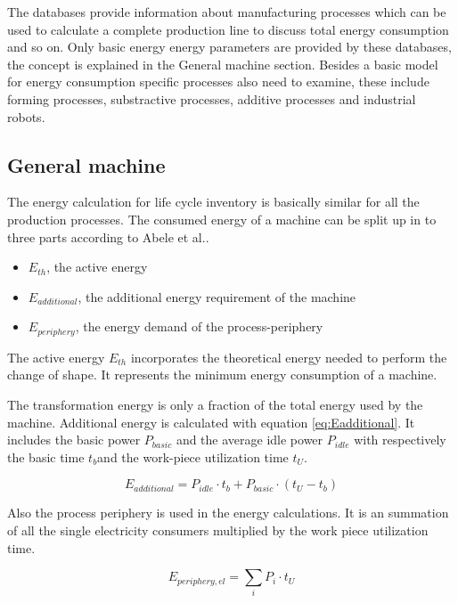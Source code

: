 The databases provide information about manufacturing processes which can be used to calculate a complete production line to discuss total energy consumption and so on. Only basic energy energy parameters are provided by these databases, the concept is explained in the General machine section. Besides a basic model for energy consumption specific processes  also need to examine, these include forming processes, substractive processes, additive processes and industrial robots.

\subsection{General machine}

The energy calculation for life cycle inventory is basically similar for all the production processes. The consumed energy of a machine can be split up in to three parts according to Abele et al.\cite{Abele2005}.
\begin{itemize}  
\item $E_{th}$, the active energy 
\item $E_{additional}$, the additional energy requirement of the machine 
\item $E_{periphery}$, the energy demand of the process-periphery 
\end{itemize}

The active energy $E_{th}$ incorporates the theoretical energy needed to perform the change of shape. It represents the minimum energy consumption of a machine. 

The transformation energy is only a fraction of the total energy used by the machine. Additional energy is calculated with equation \ref{eq:Eadditional}. It includes the basic power $P_{basic}$ and the average idle power $P_{idle}$ with respectively the basic time $t_{b}$and the work-piece utilization time $t_{U}$.

\begin{equation} \label{eq:Eadditional}
E_{additional} = P_{idle} \cdot t_b + P_{basic} \cdot (t_{U} - t_{b})
\end{equation}

Also the process periphery is used in the energy calculations. It is an summation of all the single electricity consumers multiplied by the work piece utilization time.

\begin{equation} \label{eq:Eperiphery}
E_{periphery,el} = \sum_{i} P_{i} \cdot t_U
\end{equation}

